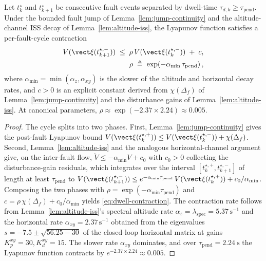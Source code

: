 \begin{lemma}
\label{lem:dwell-decay}
Let $t_k^\star$ and $t_{k+1}^\star$ be consecutive fault events separated by dwell-time $\tau_{d,k} \ge \tau_{\mathrm{pend}}$. Under the bounded fault jump of Lemma~\ref{lem:jump-continuity} and the altitude-channel ISS decay of Lemma~\ref{lem:altitude-iss}, the Lyapunov function satisfies a per-fault-cycle contraction
\begin{align}
\label{eq:dwell-contraction}
  V(\vect\xi(t_{k+1}^{\star,-}))
    \;\le\;
    \rho\, V(\vect\xi(t_k^{\star,-})) \;+\; c,\\
  \rho \;\triangleq\; \exp\!\left(
    -\alpha_{\min}\,\tau_{\mathrm{pend}} \right),
\end{align}
where $\alpha_{\min} = \min(\alpha_z, \alpha_{xy})$ is the slower of the altitude and horizontal decay rates, and $c > 0$ is an explicit constant derived from $\chi(\Delta_f)$ of Lemma~\ref{lem:jump-continuity} and the disturbance gains of Lemma~\ref{lem:altitude-iss}. At canonical parameters, $\rho \approx \exp(-2.37 \times 2.24) \approx 0.005$.
\end{lemma}

\begin{proof}
The cycle splits into two phases. First, Lemma~\ref{lem:jump-continuity} gives the post-fault Lyapunov bound $V(\vect\xi(t_k^{\star,+})) \le V(\vect\xi(t_k^{\star,-})) + \chi(\Delta_f)$. Second, Lemma~\ref{lem:altitude-iss} and the analogous horizontal-channel argument give, on the inter-fault flow, $\dot V \le -\alpha_{\min} V + c_0$ with $c_0 > 0$ collecting the disturbance-gain residuals, which integrates over the interval $[t_k^{\star,+}, t_{k+1}^{\star,-}]$ of length at least $\tau_{\mathrm{pend}}$ to $V(\vect\xi(t_{k+1}^{\star,-})) \le e^{-\alpha_{\min}\tau_{\mathrm{pend}}}\,V(\vect\xi(t_k^{\star,+})) + c_0/\alpha_{\min}$. Composing the two phases with $\rho = \exp(-\alpha_{\min}\tau_{\mathrm{pend}})$ and $c = \rho\,\chi(\Delta_f) + c_0/\alpha_{\min}$ yields \eqref{eq:dwell-contraction}. The contraction rate follows from Lemma~\ref{lem:altitude-iss}'s spectral altitude rate $\alpha_z = \lambda_{\mathrm{spec}} = 5.37\,\mathrm{s}^{-1}$ and the horizontal rate $\alpha_{xy} = 2.37\,\mathrm{s}^{-1}$ obtained from the eigenvalues $s = -7.5 \pm \sqrt{56.25 - 30}$ of the closed-loop horizontal matrix at gains $K_p^{xy} = 30, K_d^{xy} = 15$. The slower rate $\alpha_{xy}$ dominates, and over $\tau_{\mathrm{pend}} = \SI{2.24}{\second}$ the Lyapunov function contracts by $e^{-2.37 \times 2.24} \approx 0.005$.
\end{proof}

